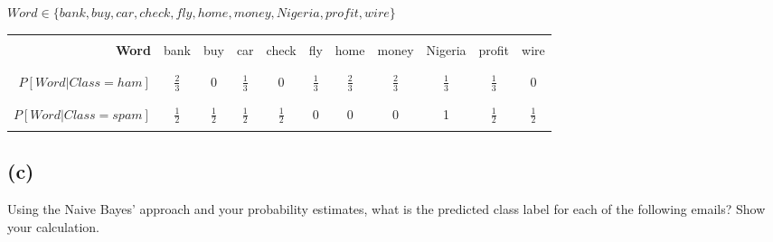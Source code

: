 \documentclass[twoside,11pt]{homework}
\begin{document}
\begin{solution}
  $Word \in \{ bank, buy, car, check, fly, home, money, Nigeria, profit, wire \}$\\
  \begin{tabular}[h]{| r | c | c | c | c | c | c | c | c | c | c |}
    \hline
    &&&&&&&&&&\\
    \textbf{Word} & bank & buy & car & check & fly & home & money & Nigeria & profit & wire \\
    &&&&&&&&&&\\
    \hline
    &&&&&&&&&&\\
    \textbf{$P[Word \vert Class = ham]$} & $\frac{2}{3}$ & 0 & $\frac{1}{3}$ & 0 & $\frac{1}{3}$ & $\frac{2}{3}$ & $\frac{2}{3}$ & $\frac{1}{3}$ & $\frac{1}{3}$ & 0\\
    &&&&&&&&&&\\
    \hline
    &&&&&&&&&&\\
    \textbf{$P[Word | Class = spam]$} & $\frac{1}{2}$ & $\frac{1}{2}$ & $\frac{1}{2}$ & $\frac{1}{2}$ & 0 & 0 & 0 & 1 & $\frac{1}{2}$ & $\frac{1}{2}$\\ 
    &&&&&&&&&&\\
    \hline
  \end{tabular}
\end{solution}

\subsection*{(c)}

\begin{prob}
  Using the Naive Bayes' approach and your probability estimates, what is the
  predicted class label for each of the following emails? Show your calculation.  
\end{prob}
\end{document}
